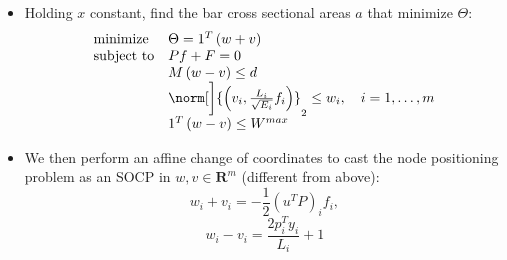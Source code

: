 \documentclass[a0]{a0poster}
\begin{document}
\begin{textblock}{7.0}
\begin{itemize}
  \item Holding \(x\) constant, find the bar cross sectional areas \(a\) that minimize \(\Theta\):
  {\small
  \begin{equation}
  \begin{array}{ll}
  \mbox{minimize}   & \Theta = 1^{T}\left(w+v\right)\\
  \mbox{subject to} & Pf + F = 0\\
            & M\left(w-v\right) \leq d\\
            & \norm[\bigg]{ \left( v_{i},\frac{L_{i}}{\sqrt{E_{i}}}f_{i} \right)}_{2}\leq w_{i},\ \ \ i = 1,\ldots,m \\
                & 1^{T}\left( w - v \right) \leq W^{max}
  \end{array}
  \label{cvxopt1}
  \end{equation}
  }
  \item We then perform an affine change of coordinates to cast the node positioning problem as an SOCP in \(w, v\in\mathbf{R}^{m}\) (different from above):
    \[w_{i} + v_{i} = -\frac{1}{2}\left(u^{T}P\right)_{i}f_{i},\]
    \[w_{i} - v_{i} = \frac{2p_{i}^{T}y_{i}}{L_{i}} + 1\]
  \end{itemize}
  
  \end{textblock}
  
\end{document}
